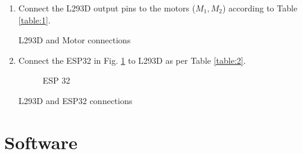 \documentclass[conference]{IEEEtran}
\begin{document}
\begin{enumerate}
\item Connect the L293D output pins to the motors  ($M_1, M_2$) according to Table \ref{table:1}.
\begin{table}[h!]
  \centering
  
  \caption{L293D and Motor connections}
  \label{table:1}
\end{table}
\item Connect  the ESP32 in Fig. \ref{fig:esp32} to L293D 
as per 
Table \ref{table:2}.
\begin{figure}[!h]
\centering
%
\caption{ESP 32}
\label{fig:esp32}
\end{figure}
\begin{table}[h!]
  \centering
  
  \caption{L293D and ESP32 connections}
  \label{table:2}
\end{table}

%

\end{enumerate}
%
\section{Software}
\end{document}
